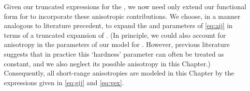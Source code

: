 Given our truncated expressions for the \sfunc, we now need only extend our
functional form for \fij to incorporate these anisotropic contributions.
We choose, in a manner analogous to literature precedent,
\cite{Stone2007,Mitchell2001,Price2000,Stone1988,Day2003,Torheyden2006,Totton2010,Misquitta2016,Price2010a}
to expand the  and  parameters of \cref{eq:aij} in terms of a truncated
expansion of \sfunc. 
(In principle, we could also account for anisotropy in the \B parameters of
our model for \fij. However, previous literature suggests that in practice this `hardness'
parameter can often be treated as constant, and we also neglect its possible
anisotropy in this Chapter.) 
Consequently, all short-range anisotropies are modeled in this Chapter
by the expressions given in \cref{eq:gij} and \cref{eq:vex}.

